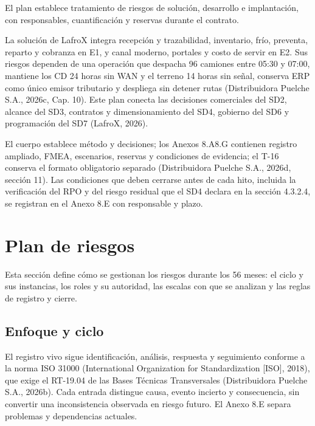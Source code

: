
El plan establece tratamiento de riesgos de solución, desarrollo e implantación, con responsables, cuantificación y reservas durante el contrato.

La solución de LafroX integra recepción y trazabilidad, inventario, frío, preventa, reparto y cobranza en E1, y canal moderno, portales y costo de servir en E2. Sus riesgos dependen de una operación que despacha 96 camiones entre 05:30 y 07:00, mantiene los CD 24 horas sin WAN y el terreno 14 horas sin señal, conserva ERP como único emisor tributario y despliega sin detener rutas (Distribuidora Puelche S.A., 2026c, Cap. 10). Este plan conecta las decisiones comerciales del SD2, alcance del SD3, contratos y dimensionamiento del SD4, gobierno del SD6 y programación del SD7 (LafroX, 2026).

El cuerpo establece método y decisiones; los Anexos 8.A\textendash{}8.G contienen registro ampliado, FMEA, escenarios, reservas y condiciones de evidencia; el T-16 conserva el formato obligatorio separado (Distribuidora Puelche S.A., 2026d, sección 11). Las condiciones que deben cerrarse antes de cada hito, incluida la verificación del RPO y del riesgo residual que el SD4 declara en la sección 4.3.2.4, se registran en el Anexo 8.E con responsable y plazo.

\section{Plan de riesgos}

Esta sección define cómo se gestionan los riesgos durante los 56 meses: el ciclo y sus instancias, los roles y su autoridad, las escalas con que se analizan y las reglas de registro y cierre.

\subsection{Enfoque y ciclo}

El registro vivo sigue identificación, análisis, respuesta y seguimiento conforme a la norma ISO 31000 (International Organization for Standardization [ISO], 2018), que exige el RT-19.04 de las Bases Técnicas Transversales (Distribuidora Puelche S.A., 2026b). Cada entrada distingue causa, evento incierto y consecuencia, sin convertir una inconsistencia observada en riesgo futuro. El Anexo 8.E separa problemas y dependencias actuales.

